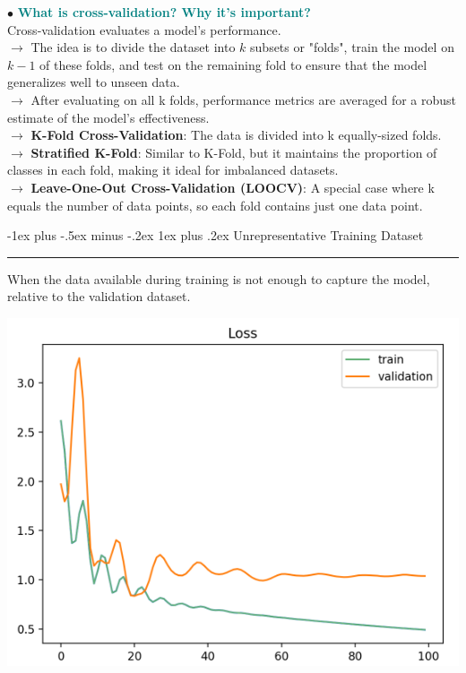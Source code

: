 \documentclass[letterpaper, 10.5pt,landscape]{article}
\makeatletter
\renewcommand{\subsubsection}{\@startsection{subsubsection}{3}{0mm}%
                                {-1ex plus -.5ex minus -.2ex}%
                                {1ex plus .2ex}%
                                {\normalfont\small\bfseries}}
\makeatother
\begin{document}
\begin{multicols*}{3}
\vspace{3pt}
$\bullet$ \textcolor{teal}{\textbf{What is cross-validation? Why it's important?}} \\
Cross-validation evaluates a model's performance. \\
$\rightarrow$ The idea is to divide the dataset into $k$ subsets or "folds", train the model on $k-1$ of these folds, and test on the remaining fold to ensure that the model generalizes well to unseen data. \\
$\rightarrow$ After evaluating on all k folds, performance metrics are averaged for a robust estimate of the model's effectiveness. \\
$\rightarrow$ \textbf{K-Fold Cross-Validation}: The data is divided into k equally-sized folds. \\
$\rightarrow$ \textbf{Stratified K-Fold}: Similar to K-Fold, but it maintains the proportion of classes in each fold, making it ideal for imbalanced datasets. \\
$\rightarrow$ \textbf{Leave-One-Out Cross-Validation (LOOCV)}: A special case where k equals the number of data points, so each fold contains just one data point.




\subsubsection{Unrepresentative Training Dataset} {\color{teal}\hrule height 0.5pt} \smallskip

When the data available during training is not enough to capture the model, relative to the validation dataset.

\vspace{-3mm}
\begin{center}
    \begin{minipage}{0.5\linewidth}
        \includegraphics[width=\textwidth]{figures/Unrepresentative_Training_Dataset.PNG}
    \end{minipage} 
\end{center}
\vspace{-3mm}



\end{multicols*}
\end{document}
